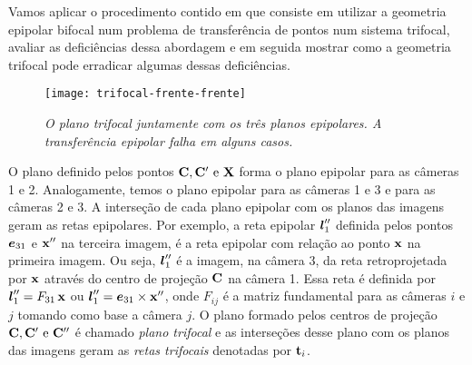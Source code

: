 Vamos aplicar o procedimento contido em \citep{Faugeras} que consiste em utilizar a geometria epipolar bifocal num problema de transferência de pontos num sistema trifocal, avaliar as deficiências dessa abordagem e em seguida mostrar como a geometria trifocal pode erradicar algumas dessas deficiências. 
\begin{figure}
\centering
\texttt{[image: trifocal-frente-frente]}
\caption{{\it O plano trifocal juntamente com os três planos epipolares. A transferência epipolar falha em alguns casos.}}
\label{fig.trifocal-frente}
\end{figure}

O plano definido pelos pontos ${\bf C}, {\bf C}' \,\,\text{e}\,\, \mathbf{X}$ forma o plano epipolar para as câmeras 1 e 2. Analogamente, temos o plano epipolar para as câmeras 1 e 3 e para as câmeras 2 e 3. A interseção de cada plano epipolar com os planos das imagens geram as retas epipolares. Por exemplo, a reta  epipolar $\boldsymbol{l}''_1$ definida pelos pontos $\boldsymbol{e}_{31}$ e $\mathbf{x}''$ na terceira imagem, é a reta epipolar com relação ao ponto $\mathbf{x}$ na primeira imagem. Ou seja, $\boldsymbol{l}''_1$ é a imagem, na câmera 3, da reta retroprojetada por $\mathbf{x}$ através do centro de projeção ${\bf C}$ na câmera 1. Essa reta é definida por $\boldsymbol{l}''_1=F_{31}\,\mathbf{x}$ ou $\boldsymbol{l}''_1=\boldsymbol{e}_{31}\times\mathbf{x}''$, onde $F_{ij}$ é a matriz fundamental para as câmeras $i$ e $j$ tomando como base a câmera $j$. O plano formado pelos centros de projeção ${\bf C}, {\bf C}' \,\,\text{e}\,\, {\bf C}''$ é chamado {\it plano trifocal} e as interseções desse plano com os planos das imagens geram as {\it retas trifocais} denotadas por ${\bf t}_i$.

